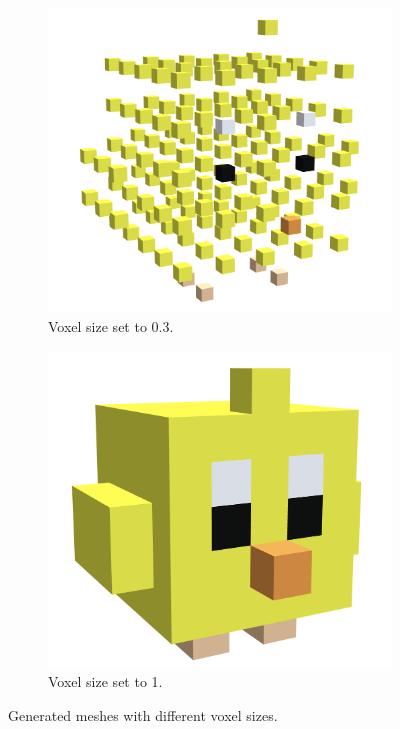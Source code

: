 \begin{figure}[htp]
    \centering
    \begin{subfigure}[t]{0.45\textwidth}
        \centering
        \includegraphics[width=\textwidth]{sections/result/figures/chicken-voxels-size-0.3.png}
        \caption{Voxel size set to 0.3.}
        \label{fig:chicken-voxels-size-0.3}
    \end{subfigure}
    \hfill
    \begin{subfigure}[t]{0.45\textwidth}
        \centering
        \includegraphics[width=\textwidth]{sections/result/figures/chicken-voxels-size-1.png}
        \caption{Voxel size set to 1.}
        \label{fig:chicken-voxels-size-1}
    \end{subfigure}
       \caption{Generated meshes with different voxel sizes.}
       \label{fig:chicken-voxels-sizes}
\end{figure}


